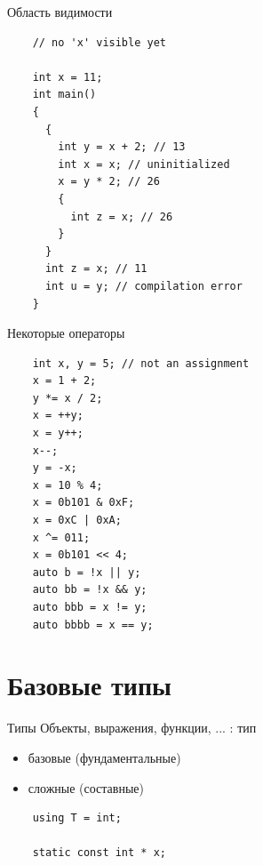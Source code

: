\documentclass[unknownkeysallowed,xcolor=table]{beamer}
\begin{document}
\begin{frame}[fragile]{Область видимости}
  \begin{lstlisting}
    // no 'x' visible yet

    int x = 11;
    int main()
    {
      {
        int y = x + 2; // 13
        int x = x; // uninitialized
        x = y * 2; // 26
        {
          int z = x; // 26
        }
      }
      int z = x; // 11
      int u = y; // compilation error
    }
  \end{lstlisting}
\end{frame}

\begin{frame}[fragile]{Некоторые операторы}
  \begin{lstlisting}
    int x, y = 5; // not an assignment
    x = 1 + 2;
    y *= x / 2;
    x = ++y;
    x = y++;
    x--;
    y = -x;
    x = 10 % 4;
    x = 0b101 & 0xF;
    x = 0xC | 0xA;
    x ^= 011;
    x = 0b101 << 4;
    auto b = !x || y;
    auto bb = !x && y;
    auto bbb = x != y;
    auto bbbb = x == y;
  \end{lstlisting}
\end{frame}

\section{Базовые типы}

\begin{frame}[fragile]{Типы}
  Объекты, выражения, функции, ... : тип

  \vspace{2em}

  \begin{itemize}
    \item базовые (фундаментальные) \vspace{1em}
    \item сложные (составные)
  \end{itemize}
  \vspace{1em}
  \begin{lstlisting}
    using T = int;

    static const int * x;
  \end{lstlisting}
\end{frame}
\end{document}
